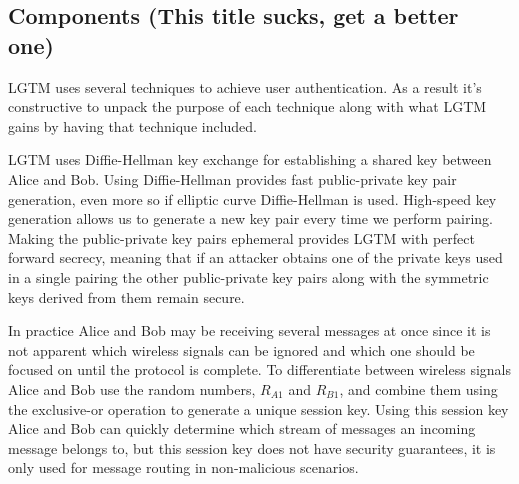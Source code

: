 \documentclass[12pt]{report}
\begin{document}
\subsection{Components (This title sucks, get a better one)}
LGTM uses several techniques to achieve user authentication. As a result it's constructive to unpack the purpose of each technique along with what LGTM gains by having that technique included. \par

LGTM uses Diffie-Hellman key exchange \cite{DiffieHellman2006} for establishing a shared key between Alice and Bob. Using Diffie-Hellman provides fast public-private key pair generation, even more so if elliptic curve Diffie-Hellman is used. High-speed key generation allows us to generate a new key pair every time we perform pairing. Making the public-private key pairs ephemeral provides LGTM with perfect forward secrecy, meaning that if an attacker obtains one of the private keys used in a single pairing the other public-private key pairs along with the symmetric keys derived from them remain secure. \par

In practice Alice and Bob may be receiving several messages at once since it is not apparent which wireless signals can be ignored and which one should be focused on until the protocol is complete. To differentiate between wireless signals Alice and Bob use the random numbers, $R_{A1}$ and $R_{B1}$, and combine them using the exclusive-or operation to generate a unique session key. Using this session key Alice and Bob can quickly determine which stream of messages an incoming message belongs to, but this session key does not have security guarantees, it is only used for message routing in non-malicious scenarios. \par
\end{document}
